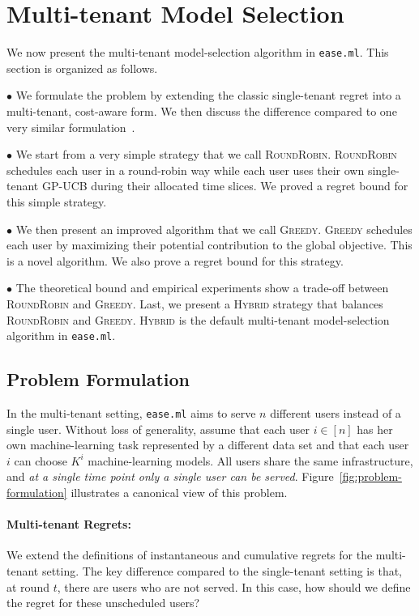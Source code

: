 \documentclass[letterpaper]{vldb}
\newcommand{\eml}{\texttt{ease.ml}\xspace}
\newcommand{\rr}{\textsc{RoundRobin}\xspace}
\newcommand{\hybrid}{\textsc{Hybrid}\xspace}
\newcommand{\greedy}{\textsc{Greedy}\xspace}
\begin{document}
\section{Multi-tenant Model Selection}\label{sec:multitenant}

We now present the multi-tenant model-selection
algorithm in \eml. This section is organized as follows.

\noindent
$\bullet$ We formulate the problem 
by extending the classic single-tenant regret
into a multi-tenant, cost-aware form. We then 
discuss the difference compared to
one very similar formulation~\cite{Swersky2013}.

\noindent
$\bullet$
We start from a very simple strategy that we call
\rr. \rr schedules
each user in a round-robin way while each user
uses their own single-tenant GP-UCB
during their allocated time slices. We proved 
a regret bound for this simple strategy.

\noindent
$\bullet$
We then present an improved algorithm that we
call \greedy. \greedy schedules
each user by maximizing their potential contribution
to the global objective. This is a novel algorithm.
We also prove a regret bound for this strategy.

\noindent
$\bullet$
The theoretical bound and empirical experiments
show a trade-off between \rr and
\greedy. Last, we present a \hybrid 
strategy that balances 
\rr and \greedy. \hybrid is the 
default multi-tenant model-selection algorithm
in \eml.


\vspace{-0.5em}
\subsection{Problem Formulation}

In the multi-tenant setting, \eml aims
to serve $n$ different users instead of a single user.
Without loss of generality, assume that
each user $i\in[n]$ has her own machine-learning 
task represented by a different data set
and that each user $i$ can choose
$K^{i}$ machine-learning models.
All users share the same infrastructure,
and {\em at a single time point only
a single user can be served}.
Figure~\ref{fig:problem-formulation} illustrates 
a canonical view of this problem.

\vspace{-0.5em}
\paragraph*{Multi-tenant Regrets:} 
We extend the definitions of instantaneous and cumulative 
regrets for the multi-tenant setting. The key difference
compared to the single-tenant setting is that,
at round $t$, there are users who are not
served. In this case, how should we define
the regret for these unscheduled users?
\end{document}
